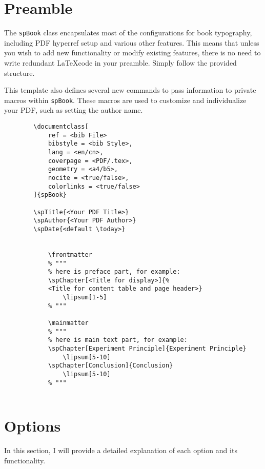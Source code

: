 
\section{Preamble}
    The \texttt{spBook} class encapsulates most of the configurations for book typography, including PDF hyperref setup and various other features. This means that unless you wish to add new functionality or modify existing features, there is no need to write redundant \LaTeX code in your preamble. Simply follow the provided structure.

    This template also defines several new commands to pass information to private macros within \texttt{spBook}. These macros are used to customize and individualize your PDF, such as setting the author name.

    \begin{Verbatim}
        \documentclass[
            ref = <bib File>
            bibstyle = <bib Style>,
            lang = <en/cn>,
            coverpage = <PDF/.tex>,
            geometry = <a4/b5>,
            nocite = <true/false>,
            colorlinks = <true/false>
        ]{spBook}

        \spTitle{<Your PDF Title>}
        \spAuthor{<Your PDF Author>}
        \spDate{<default \today>}

        
            \frontmatter
            % """
            % here is preface part, for example:
            \spChapter[<Title for display>]{%
            <Title for content table and page header>}
                \lipsum[1-5]
            % """

            \mainmatter
            % """
            % here is main text part, for example:
            \spChapter[Experiment Principle]{Experiment Principle}
                \lipsum[5-10]
            \spChapter[Conclusion]{Conclusion}
                \lipsum[5-10]
            % """
        
    \end{Verbatim}

\section{Options}
    In this section, I will provide a detailed explanation of each option and its functionality.

